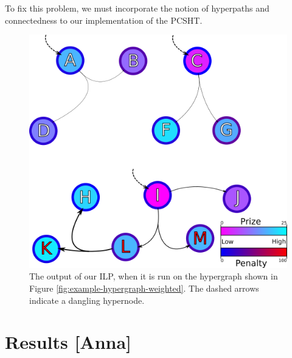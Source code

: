 \documentclass[12pt,twoside]{reedthesis}
\newcommand{\new}[2]{{\color{orange}#1 [#2]}}
\theoremstyle{definition}
\begin{document}
To fix this problem, we must incorporate the notion of hyperpaths and connectedness to our implementation of the PCSHT.
\begin{figure}[thbp]
  \begin{center}
    \includegraphics{example-hypergraph-weighted-after-ILP}
  \caption[Output from ILP with disconnected sub-hypergraphs]{The output of our ILP, when it is run on the hypergraph shown in Figure \ref{fig:example-hypergraph-weighted}. The dashed arrows indicate a dangling hypernode.}
  \label{fig:example-hypergraph-weighted-after-ILP}
  \end{center}
\end{figure}

\chapter{\new{Results}{Anna}}
\end{document}
